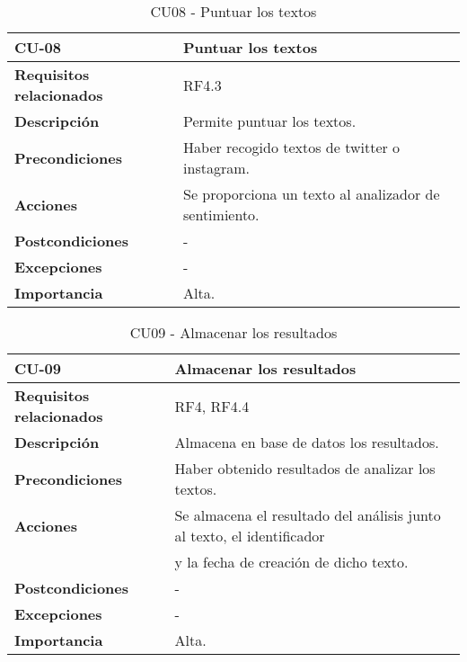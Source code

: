 \begin{table}[ht!]
    \centering
    \resizebox{15cm}{!} {
    \begin{tabular}{|l|l|}
    \hline
         \textbf{CU-08}     &  \textbf{Puntuar los textos} \\ \hline
         \textbf{Requisitos relacionados}       & RF4.3 \\ \hline
         \textbf{Descripción}    & Permite puntuar los textos. \\ \hline   
         \textbf{Precondiciones}      & Haber recogido textos de twitter o instagram.\\ \hline
         \textbf{Acciones}      & Se proporciona un texto al analizador de sentimiento. \\ \hline
         \textbf{Postcondiciones}       & - \\ \hline
         \textbf{Excepciones}       &- \\ \hline
         \textbf{Importancia}   & Alta.\\
         \hline
    \end{tabular}}
    \caption{CU08 - Puntuar los textos}
    \label{tab:my_label}
\end{table}


\begin{table}[ht!]
    \centering
    \resizebox{15cm}{!} {
    \begin{tabular}{|l|l|}
    \hline
         \textbf{CU-09}     &  \textbf{Almacenar los resultados} \\ \hline
         \textbf{Requisitos relacionados}       & RF4, RF4.4 \\ \hline
         \textbf{Descripción}    & Almacena en base de datos los resultados. \\ \hline   
         \textbf{Precondiciones}      & Haber obtenido resultados de analizar los textos.\\ \hline
         \textbf{Acciones}      & Se almacena el resultado del análisis junto al texto, el identificador \\ &y la fecha de creación de dicho texto. \\ \hline
         \textbf{Postcondiciones}       & - \\ \hline
         \textbf{Excepciones}       &- \\ \hline
         \textbf{Importancia}   & Alta.\\
         \hline
    \end{tabular}}
    \caption{CU09 - Almacenar los resultados}
    \label{tab:my_label}
\end{table}


